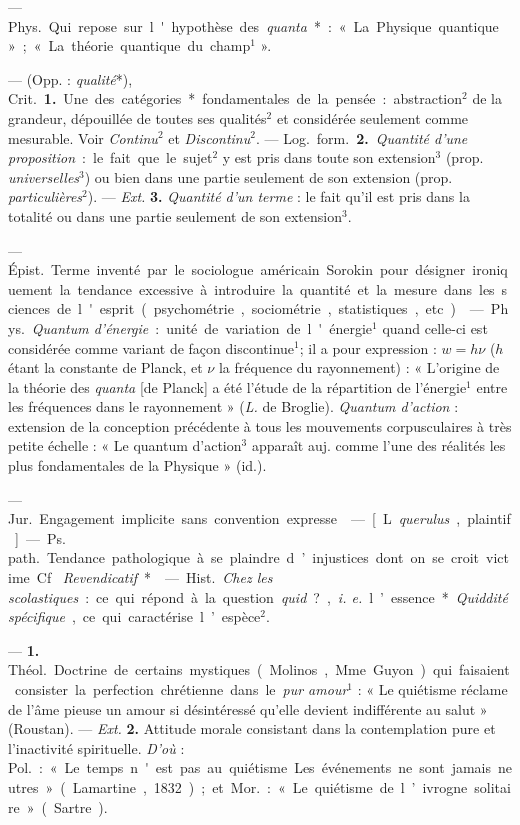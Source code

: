 \begin{itemize}[leftmargin=1cm, label=, itemsep=1pt]
 — \si{Phys.} Qui repose sur l'hypothèse des {\it quanta}* : «
La Physique quantique » ; « La théorie quantique du champ$^1$ ».

 — (Opp. : {\it qualité}*), \si{Crit.} {\bf 1.} Une des
catégories* fondamentales de la pensée : abstraction$^2$ de la grandeur,
dépouillée de toutes ses qualités$^2$ et considérée seulement comme
mesurable. Voir {\it Continu}$^2$ et {\it Discontinu}$^2$. — \si{Log.}
\si{form.} {\bf 2.} {\it Quantité d'une proposition} : le fait que le
sujet$^2$ y est pris dans toute son extension$^3$ (prop.
{\it universelles}$^3$) ou bien dans une partie seulement de son extension
(prop. {\it particulières}$^2$). — {\it Ext.} {\bf 3.} {\it Quantité d'un
terme} : le fait qu'il est pris dans la totalité ou dans une partie seulement
de son extension$^3$.

 — \si{Épist.} Terme inventé par le sociologue américain
Sorokin pour désigner ironiquement la tendance excessive à introduire la
quantité et la mesure dans les sciences de l'esprit (psychométrie,
sociométrie, statistiques, etc.).

 — \si{Phys.} {\it Quantum d'énergie} : unité de variation de
l'énergie$^1$ quand celle-ci est considérée comme variant de façon
discontinue$^1$; il a pour expression : $ w = h \nu $ ($h$ étant la constante
de Planck, et $\nu$ la fréquence du rayonnement) : « L’origine de la théorie
des {\it quanta} [de Planck] a été l'étude de la répartition de l’énergie$^1$
entre les fréquences dans le rayonnement » ({\it L.} de Broglie). {\it
Quantum d’action} : extension de la conception précédente à tous les
mouvements corpusculaires à très petite échelle : « Le quantum d'action$^3$
apparaît auj. comme l’une des réalités les plus fondamentales de la Physique
» (id.).

 — \si{Jur.} Engagement implicite sans convention expresse.

 — [L. {\it querulus}, plaintif] — \si{Ps. path.} Tendance
pathologique à se plaindre d’injustices dont on se croit victime. Cf. {\it
Revendicatif}*.

 — \si{Hist.} {\it Chez les scolastiques} : ce qui répond à la
question {\it quid} ?, {\it i. e.} l’essence*. {\it Quiddité spécifique}, ce
qui caractérise l’espèce$^2$.

 —  {\bf 1.} \si{Théol.} Doctrine de certains
mystiques (Molinos, Mme Guyon) qui faisaient consister la perfection
chrétienne dans le {\it pur amour}$^1$ : « Le quiétisme réclame de l'âme
pieuse un amour si désintéressé qu'elle devient indifférente au salut
» (Roustan). — {\it Ext.}  {\bf 2.} Attitude morale consistant
dans la contemplation pure et l'inactivité spirituelle. {\it D’où} :
\si{Pol.} : « Le temps n'est pas au quiétisme... Les événements ne sont
jamais neutres » (Lamartine, 1832) ; et \si{Mor.} : « Le quiétisme de
l’ivrogne solitaire » (Sartre).


\end{itemize}
